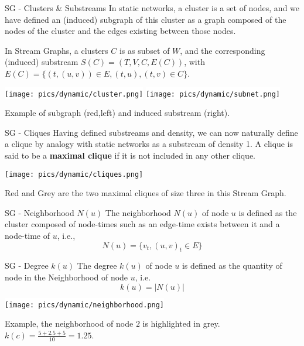 \begin{textbox}{SG - Clusters \& Substreams}
    In static networks, a cluster is a set of nodes, and we have defined an (induced) subgraph of this cluster as a graph composed of the nodes of the cluster and the edges existing between those nodes.

    In Stream Graphs, a clusters $C$ is as subset of $W$, and the corresponding (induced) substream $S(C)=(T,V,C,E(C))$, with $E(C)=\{(t,(u,v)) \in E, (t,u),(t,v) \in C\}$.

    \centering
    \vspace{0.3cm}

    \colorbox{white}{\texttt{[image: pics/dynamic/cluster.png]}}
    \colorbox{white}{\texttt{[image: pics/dynamic/subnet.png]}}

    Example of subgraph (red,left) and induced substream (right).
\end{textbox}


\begin{textbox}{SG - Cliques}
    Having defined substreams and density, we can now naturally define a clique by analogy with static networks as a substream of density 1. A clique is said to be a \textbf{maximal clique} if it is not included in any other clique.

    \centering
    \vspace{0.3cm}

    \texttt{[image: pics/dynamic/cliques.png]}

    Red and Grey are the two maximal cliques of size three in this Stream Graph.
\end{textbox}


\begin{textbox}{SG - Neighborhood $N(u)$}
    The neighborhood $N(u)$ of node $u$ is defined as the cluster composed of node-times such as an edge-time exists between it and a node-time of $u$, i.e.,
    \[
        N(u)= \{v_t,(u,v)_t \in E\}
    \]
\end{textbox}


\begin{textbox}{SG - Degree $k(u)$}
    The degree $k(u)$ of node $u$ is defined as the quantity of node in the Neighborhood of node $u$, i.e.
    \[
        k(u)=|N(u)|
    \]

    \centering
    \colorbox{white}{\texttt{[image: pics/dynamic/neighborhood.png]}}

    Example, the neighborhood of node $2$ is highlighted in grey. \\$k(c)=\frac{5+2.5+5}{10}=1.25$.
\end{textbox}


